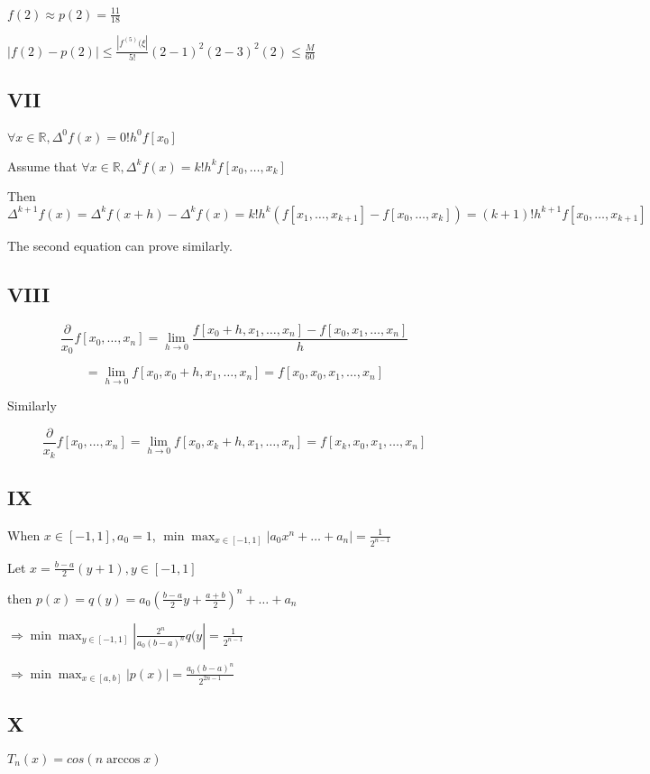 \documentclass[12]{article}%
\begin{document}
        $f(2)\approx p(2)=\frac{11}{18}$

        $|f(2)-p(2)|\le \frac{|f^{(5)}(\xi|}{5!}(2-1)^2(2-3)^2(2)\le \frac{M}{60}$

        \subsection{VII}
            $\forall x\in \mathbb{R},\Delta^0f(x)=0!h^0f[x_0]$

            Assume that $\forall x\in \mathbb{R},\Delta^kf(x)=k!h^kf[x_0,\dots,x_k]$

            Then $\Delta^{k+1}f(x)=\Delta^kf(x+h)-\Delta^kf(x)=k!h^k(f[x_1,\dots,x_{k+1}]-f[x_0,\dots,x_{k}])=(k+1)!h^{k+1}f[x_0,\dots,x_{k+1}]$

            The second equation can prove similarly.

        \subsection{VIII}
            $$\frac{\partial}{x_0}f[x_0,\dots,x_n]=\lim_{h \rightarrow 0}\frac{f[x_0+h,x_1,\dots,x_n]-f[x_0,x_1,\dots,x_n]}{h}$$

            $$=\lim_{h \rightarrow 0}f[x_0,x_0+h,x_1,\dots,x_n]=f[x_0,x_0,x_1,\dots,x_n]$$

            Similarly

            $$\frac{\partial}{x_k}f[x_0,\dots,x_n]=\lim_{h \rightarrow 0}f[x_0,x_k+h,x_1,\dots,x_n]=f[x_k,x_0,x_1,\dots,x_n]$$

        \subsection{IX}
            When $x\in[-1,1],a_0=1$, $\min\max_{x\in[-1,1]}|a_0x^n+\dots+a_n|=\frac{1}{2^{n-1}}$

            Let $x=\frac{b-a}{2}(y+1),y\in[-1,1]$

            then $p(x)=q(y)=a_0(\frac{b-a}{2}y+\frac{a+b}{2})^n+\dots+a_n$

            $\Rightarrow\min\max_{y\in[-1,1]}|\frac{2^n}{a_0(b-a)^n}q(y|=\frac{1}{2^{n-1}}$

            $\Rightarrow\min\max_{x\in[a,b]}|p(x)|=\frac{a_0(b-a)^n}{2^{2n-1}}$

        \subsection{X}
            $T_n(x)=cos(n \arccos x)$
\end{document}
